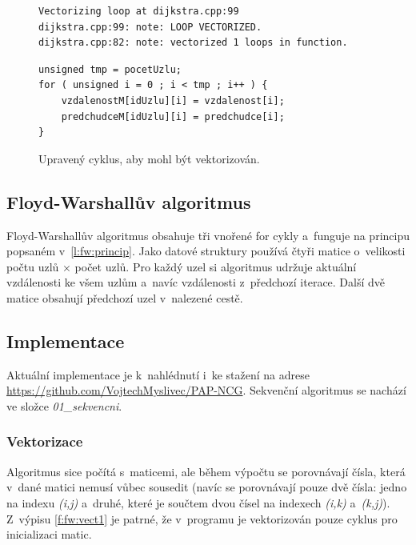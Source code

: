 \begin{figure}
    \centering
    \caption{Upravený cyklus, aby mohl být vektorizován.}
	\label{f:dij:vect3}
    \begin{lstlisting}
Vectorizing loop at dijkstra.cpp:99
dijkstra.cpp:99: note: LOOP VECTORIZED.
dijkstra.cpp:82: note: vectorized 1 loops in function.
    \end{lstlisting}
    
	\begin{lstlisting}
unsigned tmp = pocetUzlu;
for ( unsigned i = 0 ; i < tmp ; i++ ) {
	vzdalenostM[idUzlu][i] = vzdalenost[i];
	predchudceM[idUzlu][i] = predchudce[i];
}
	\end{lstlisting}
\end{figure}




\subsection{Floyd-Warshallův algoritmus}
Floyd-Warshallův algoritmus obsahuje tři vnořené for cykly a~funguje na principu popsaném v~\ref{l:fw:princip}. Jako datové struktury používá čtyři matice o~velikosti počtu uzlů $\times$ počet uzlů. Pro každý uzel si algoritmus udržuje aktuální vzdálenosti ke všem uzlům a~navíc vzdálenosti z~předchozí iterace. Další dvě matice obsahují předchozí uzel v~nalezené cestě. 

\subsection{Implementace}
Aktuální implementace je k~nahlédnutí i~ke stažení na adrese \url{https://github.com/VojtechMyslivec/PAP-NCG}. Sekvenční algoritmus se nachází ve složce \textit{01\_sekvencni}.

\subsubsection{Vektorizace}
Algoritmus sice počítá s~maticemi, ale během výpočtu se porovnávají čísla, která v~dané matici nemusí vůbec sousedit (navíc se porovnávají pouze dvě čísla: jedno na indexu \emph{(i,j)} a~druhé, které je součtem dvou čísel na indexech \emph{(i,k)} a~\emph{(k,j)}).
Z~výpisu \ref{f:fw:vect1} je patrné, že v~programu je vektorizován pouze cyklus pro inicializaci matic. 

